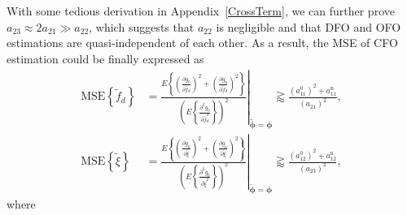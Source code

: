 \documentclass[12pt, draftclsnofoot, onecolumn]{IEEEtran}
\begin{document}
With some tedious derivation in Appendix~\ref{CrossTerm}, we can further prove ${{a}_{23}}\approx 2{{a}_{21}}\gg {{a}_{22}}$, which suggests that ${{a}_{22}}$ is negligible and that DFO and OFO estimations are quasi-independent of each other. As a result, the MSE of CFO estimation could be finally expressed as~\cite{W_Zhang2013TSP, G_Wang2011TWC}
\begin{align}
 \text{MSE}\left\{ {{{\tilde{f}}}_{d}} \right\} & ={{\left. \frac{E\left\{ {{\left( \frac{\partial {{g}_{0}}}{\partial {{{\tilde{f}}}_{d}}} \right)}^{2}}+{{\left( \frac{\partial {{g}_{\mathrm{n}}}}{\partial {{{\tilde{f}}}_{d}}} \right)}^{2}} \right\}}{{{\left( E\left\{ \frac{{{\partial }^{2}}{{g}_{0}}}{\partial \tilde{f}_{d}^{2}} \right\} \right)}^{2}}} \right|}_{\boldsymbol{\tilde{\phi}} = \boldsymbol{\phi} }}  \gtrapprox \frac{\left( a_{11}^{0} \right)^{2} + a_{11}^{\mathrm{n}}}{\left( a_{21} \right)^{2}}, \\
 \text{MSE}\left\{ {\tilde{\xi }} \right\} & = {{\left. \frac{E\left\{ {{\left( \frac{\partial {{g}_{0}}}{\partial \tilde{\xi }} \right)}^{2}}+{{\left( \frac{\partial {{g}_{\mathrm{n}}}}{\partial \tilde{\xi }} \right)}^{2}} \right\}}{{{\left( E\left\{ \frac{{{\partial }^{2}}{{g}_{0}}}{\partial {{{\tilde{\xi }}}^{2}}} \right\} \right)}^{2}}} \right|}_{\boldsymbol{\tilde{\phi}} = \boldsymbol{\phi} }} \gtrapprox \frac{\left( a_{12}^{0} \right)^{2} + a_{12}^{\mathrm{n}}}{\left( a_{23} \right)^{2}},
\end{align}
where
\end{document}
